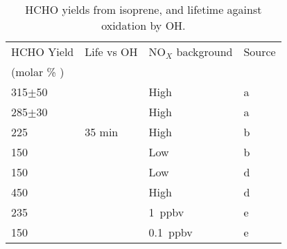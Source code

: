       \begin{table} \begin{threeparttable}
          \caption{ HCHO yields from isoprene, and lifetime against oxidation by OH. }
          \begin{tabular}{  l  l  l  l  }
            \toprule
             HCHO Yield    & Life vs OH   & NO$_X$ background & Source   \\
            (molar \% )   &              &                   &          \\
            \midrule 
             315$\pm$50      &            & High          & a        \\ 
             285$\pm$30      &            & High          & a        \\ 
             225             & 35 min     & High          & b        \\ %
             150             &            & Low           & b        \\ %
             150             &            & Low           & d        \\
             450             &            & High          & d        \\
             235             &            & 1~ppbv        & e        \\
             150             &            & 0.1~ppbv      & e        \\

\end{tabular}
\end{threeparttable}
\end{table}
